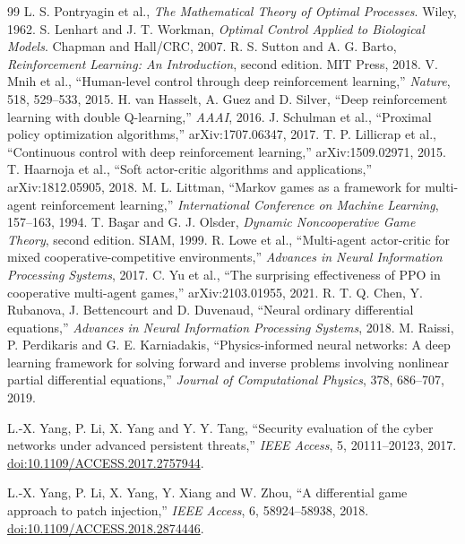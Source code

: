 \documentclass[11pt,a4paper]{article}
\theoremstyle{definition}
\theoremstyle{remark}
\begin{document}
\clearpage
\begin{thebibliography}{99}
 L. S. Pontryagin et al., \emph{The Mathematical Theory of Optimal Processes}. Wiley, 1962.
 S. Lenhart and J. T. Workman, \emph{Optimal Control Applied to Biological Models}. Chapman and Hall/CRC, 2007.
 R. S. Sutton and A. G. Barto, \emph{Reinforcement Learning: An Introduction}, second edition. MIT Press, 2018.
 V. Mnih et al., ``Human-level control through deep reinforcement learning,'' \emph{Nature}, 518, 529--533, 2015.
 H. van Hasselt, A. Guez and D. Silver, ``Deep reinforcement learning with double Q-learning,'' \emph{AAAI}, 2016.
 J. Schulman et al., ``Proximal policy optimization algorithms,'' arXiv:1707.06347, 2017.
 T. P. Lillicrap et al., ``Continuous control with deep reinforcement learning,'' arXiv:1509.02971, 2015.
 T. Haarnoja et al., ``Soft actor-critic algorithms and applications,'' arXiv:1812.05905, 2018.
 M. L. Littman, ``Markov games as a framework for multi-agent reinforcement learning,'' \emph{International Conference on Machine Learning}, 157--163, 1994.
 T. Ba\c{s}ar and G. J. Olsder, \emph{Dynamic Noncooperative Game Theory}, second edition. SIAM, 1999.
 R. Lowe et al., ``Multi-agent actor-critic for mixed cooperative-competitive environments,'' \emph{Advances in Neural Information Processing Systems}, 2017.
 C. Yu et al., ``The surprising effectiveness of PPO in cooperative multi-agent games,'' arXiv:2103.01955, 2021.
 R. T. Q. Chen, Y. Rubanova, J. Bettencourt and D. Duvenaud, ``Neural ordinary differential equations,'' \emph{Advances in Neural Information Processing Systems}, 2018.
 M. Raissi, P. Perdikaris and G. E. Karniadakis, ``Physics-informed neural networks: A deep learning framework for solving forward and inverse problems involving nonlinear partial differential equations,'' \emph{Journal of Computational Physics}, 378, 686--707, 2019.

 L.-X. Yang, P. Li, X. Yang and Y. Y. Tang, ``Security evaluation of the cyber networks under advanced persistent threats,'' \emph{IEEE Access}, 5, 20111--20123, 2017. \href{https://doi.org/10.1109/ACCESS.2017.2757944}{doi:10.1109/ACCESS.2017.2757944}.

 L.-X. Yang, P. Li, X. Yang, Y. Xiang and W. Zhou, ``A differential game approach to patch injection,'' \emph{IEEE Access}, 6, 58924--58938, 2018. \href{https://doi.org/10.1109/ACCESS.2018.2874446}{doi:10.1109/ACCESS.2018.2874446}.


\end{thebibliography}
\end{document}
